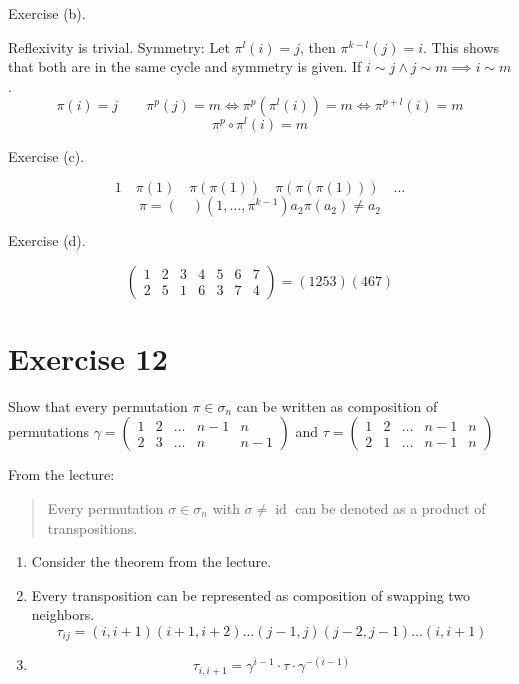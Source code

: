 \documentclass[a4paper]{article}
\theoremstyle{definition}
\begin{document}
Exercise (b).

Reflexivity is trivial.
Symmetry: Let $\pi^l(i) = j$, then $\pi^{k-l}(j) = i$. This shows that both are in the same cycle and symmetry is given.
If $i \sim j \land j \sim m \implies i \sim m$.
\[ \pi(i) = j \qquad \pi^p(j) = m \iff \pi^p(\pi^l(i)) = m \iff \pi^{p+l}(i) = m \]
\[ \pi^p \circ \pi^l(i) = m \]

Exercise (c).

\[ 1 \quad \pi(1) \quad \pi(\pi(1)) \quad \pi(\pi(\pi(1))) \quad \dots \]
\[ \pi = (\quad)  (1, \dots, \pi^{k-1}) a_2 \pi(a_2) \neq a_2 \]

Exercise (d).

\[ \begin{pmatrix} 1 & 2 & 3 & 4 & 5 & 6 & 7 \\ 2 & 5 & 1 & 6 & 3 & 7 & 4 \end{pmatrix} = (1253) (467) \]

\section{Exercise 12}
\begin{ex}
  Show that every permutation $\pi \in \sigma_n$ can be written as composition of permutations
  $\gamma = \begin{pmatrix} 1 & 2 & \dots & n-1 & n \\ 2 & 3 & \dots & n & n-1 \end{pmatrix}$
  and $\tau = \begin{pmatrix} 1 & 2 & \dots & n-1 & n \\ 2 & 1 & \dots & n-1 & n \end{pmatrix}$
\end{ex}

From the lecture:
\begin{quote}
  Every permutation $\sigma \in \sigma_n$ with $\sigma \neq \operatorname{id}$ can be denoted as a product of transpositions.
\end{quote}

\begin{enumerate}
  \item Consider the theorem from the lecture.
  \item Every transposition can be represented as composition of swapping two neighbors.
    \[ \tau_{ij} = (i, i+1) (i+1, i+2) \dots (j-1, j) (j-2, j-1) \dots (i, i+1) \]
  \item
    \[ \tau_{i,i+1} = \gamma^{i-1} \cdot \tau \cdot \gamma^{-(i-1)} \]
\end{enumerate}
\end{document}
